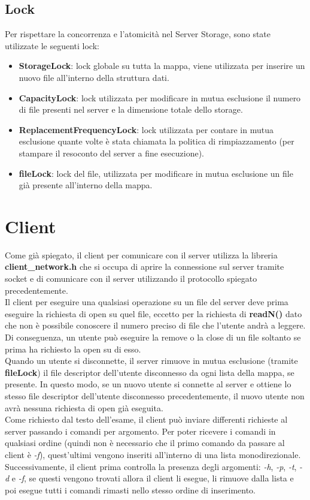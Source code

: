 \documentclass{article}
\begin{document}
\subsection{Lock}
Per rispettare la concorrenza e l'atomicità nel Server Storage, sono state utilizzate le seguenti lock:
\begin{itemize}
    \itemsep 0em 
    \item \textbf{StorageLock}: lock globale su tutta la mappa, viene utilizzata per inserire un nuovo file all'interno della struttura dati.
    \item \textbf{CapacityLock}: lock utilizzata per modificare in mutua esclusione il numero di file presenti nel server e la dimensione totale dello storage. 
    \item \textbf{ReplacementFrequencyLock}: lock utilizzata per contare in mutua esclusione quante volte è stata chiamata la politica di rimpiazzamento (per stampare il resoconto del server a fine esecuzione).
    \item \textbf{fileLock}: lock del file, utilizzata per modificare in mutua esclusione un file già presente all'interno della mappa.
\end{itemize}

\section{Client}

Come già spiegato, il client per comunicare con il server utilizza la libreria \textbf{client\_network.h} che si occupa di aprire la connessione sul server tramite socket e di
comunicare con il server utilizzando il protocollo spiegato precedentemente. \\ 
Il client per eseguire una qualsiasi operazione su un file del server deve prima eseguire la richiesta
di open su quel file, eccetto per la richiesta di \textbf{readN()} dato che non è possibile conoscere il numero preciso di file che l'utente andrà a leggere. Di conseguenza, 
un utente può eseguire la remove o la close di un file soltanto se prima ha richiesto la open su di esso. \\
Quando un utente si disconnette, il server rimuove in mutua esclusione (tramite \textbf{fileLock}) il file descriptor dell'utente disconnesso da ogni lista della mappa,
se presente. In questo modo, se un nuovo utente si connette al server e ottiene lo stesso file descriptor dell'utente disconnesso precedentemente, il nuovo utente non avrà
nessuna richiesta di open già eseguita.
\\[8pt]
Come richiesto dal testo dell'esame, il client può inviare differenti richieste al server passando i comandi per argomento. Per poter ricevere i comandi in qualsiasi ordine 
(quindi non è necessario che il primo comando da passare al client è \textit{-f}), quest'ultimi vengono inseriti all'interno di una lista monodirezionale. Successivamente, il client
prima controlla la presenza degli argomenti: \textit{-h}, \textit{-p}, \textit{-t}, \textit{-d} e \textit{-f}, se questi vengono trovati allora il client li esegue,
li rimuove dalla lista e poi esegue tutti i comandi rimasti nello stesso ordine di inserimento.
\end{document}

